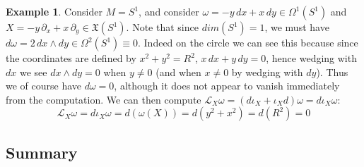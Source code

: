 \documentclass[11pt, oneside]{article}   	%
\theoremstyle{definition}
\newtheorem{example}{Example}[section]
\begin{document}
\begin{example}
	Consider $M = S^1$, and consider $\omega = -y\,dx + x\,dy\in\Omega^1(S^1)$ and $X = -y\,\partial_x + x\,\partial_y\in
	\mathfrak X(S^1)$. Note that since $dim(S^1) = 1$, we must have $d\omega = 2\,dx\wedge dy\in\Omega^2(S^1) \equiv
	0$. Indeed on the circle we can see this because since the coordinates are defined by $x^2 + y^2 = R^2$, $x\,dx + 
	y\,dy = 0$, hence wedging with $dx$ we see $dx\wedge dy = 0$ when $y\neq 0$ (and when $x\neq 0$ by wedging with 
	$dy$). Thus we of course have $d\omega = 0$, although it does not appear to vanish immediately from the computation. 
	We can then compute $\mathcal L_X\omega = (d\iota_X + \iota_X d)\omega = d\iota_X\omega$:
	\begin{equation}
		\mathcal L_X\omega = d\iota_X\omega = d(\omega(X)) = d(y^2 + x^2) = d(R^2) = 0
	\end{equation}
	
\end{example}

\newpage
\subsection{Summary}
\end{document}
